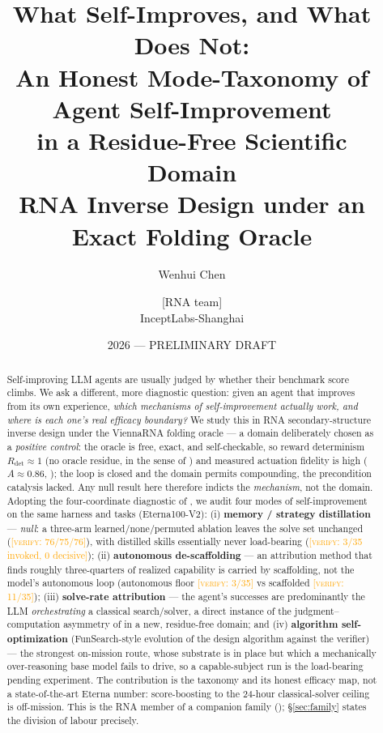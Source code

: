 \documentclass[11pt]{article}
\title{\textbf{What Self-Improves, and What Does Not:\\
An Honest Mode-Taxonomy of Agent Self-Improvement\\ in a Residue-Free Scientific Domain}\\[3pt]
\large RNA Inverse Design under an Exact Folding Oracle}
\author{Wenhui Chen \and [RNA team] \\ InceptLabs-Shanghai}
\date{2026 --- PRELIMINARY DRAFT}
\newcommand{\Rdet}{R_{\mathrm{det}}}
\newcommand{\verify}[1]{\textcolor{orange}{[\textsc{verify}: #1]}}
\begin{document}
\maketitle

\begin{abstract}
Self-improving LLM agents are usually judged by whether their benchmark score climbs. We ask a
different, more diagnostic question: given an agent that improves from its own experience, \emph{which
mechanisms of self-improvement actually work, and where is each one's real efficacy boundary?} We
study this in RNA secondary-structure inverse design under the ViennaRNA folding oracle --- a domain
deliberately chosen as a \emph{positive control}: the oracle is free, exact, and self-checkable, so
reward determinism $\Rdet\approx 1$ (no oracle residue, in the sense of \citealp{oracleresidue}) and
measured actuation fidelity is high ($A\approx 0.86$, \citealp{actuation}); the loop is closed and the
domain permits compounding, the precondition catalysis lacked. Any null result here therefore
indicts the \emph{mechanism}, not the domain. Adopting the four-coordinate diagnostic of
\citet{determinismmanifold}, we audit four modes of self-improvement on the same harness and tasks
(Eterna100-V2): (i) \textbf{memory / strategy distillation} --- \emph{null}: a three-arm
learned/none/permuted ablation leaves the solve set unchanged (\verify{76/75/76}), with distilled
skills essentially never load-bearing (\verify{3/35 invoked, 0 decisive}); (ii) \textbf{autonomous
de-scaffolding} --- an attribution method that finds roughly three-quarters of realized capability is
carried by scaffolding, not the model's autonomous loop (autonomous floor \verify{3/35} vs scaffolded
\verify{11/35}); (iii) \textbf{solve-rate attribution} --- the agent's successes are predominantly the
LLM \emph{orchestrating} a classical search/solver, a direct instance of the
judgment--computation asymmetry of \citet{oracleresidue} in a new, residue-free domain; and (iv)
\textbf{algorithm self-optimization} (FunSearch-style evolution of the design algorithm against the
verifier) --- the strongest on-mission route, whose substrate is in place but which a mechanically
over-reasoning base model fails to drive, so a capable-subject run is the load-bearing pending
experiment. The contribution is the taxonomy and its honest efficacy map, not a state-of-the-art
Eterna number: score-boosting to the 24-hour classical-solver ceiling is off-mission. This is the
RNA member of a companion family (\citealp{determinismmanifold,actuation,oracleresidue,
compoundingprofile}); \S\ref{sec:family} states the division of labour precisely.
\end{abstract}
\end{document}
